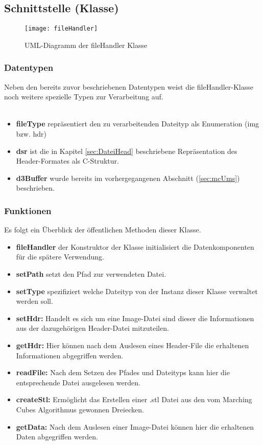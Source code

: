 \subsection{Schnittstelle (Klasse)}
\begin{figure}
	\centering
	\texttt{[image: fileHandler]}
	\caption{UML-Diagramm der fileHandler Klasse}
	\label{fig:fileHandler}
\end{figure}
\subsubsection{Datentypen}
Neben den bereits zuvor beschriebenen Datentypen weist die fileHandler-Klasse noch weitere spezielle Typen zur Verarbeitung auf.\\
\\
\begin{itemize}
	\item \textbf{fileType} repräsentiert den zu verarbeitenden Dateityp als Enumeration (img bzw. hdr) 
	\item \textbf{dsr} ist die in Kapitel \ref{sec:DateiHead} beschriebene Repräsentation des Header-Formates als C-Struktur.
	\item \textbf{d3Buffer} wurde bereits im vorhergegangenen Abschnitt (\ref{sec:mcUms}) beschrieben.
\end{itemize}
\subsubsection{Funktionen}
Es folgt ein Überblick der öffentlichen Methoden dieser Klasse.\\
\begin{itemize}
	\item \textbf{fileHandler} der Konstruktor der Klasse initialisiert die Datenkomponenten für die spätere Verwendung.
	\item \textbf{setPath} setzt den Pfad zur verwendeten Datei.
	\item \textbf{setType} spezifiziert welche Dateityp von der Instanz dieser Klasse verwaltet werden soll.
	\item \textbf{setHdr:} Handelt es sich um eine Image-Datei sind dieser die Informationen aus der dazugehörigen Header-Datei mitzuteilen. 
	\item \textbf{getHdr:} Hier können nach dem Auslesen eines Header-File die erhaltenen Informationen abgegriffen werden. 
	\item \textbf{readFile:} Nach dem Setzen des Pfades und Dateityps kann hier die entsprechende Datei ausgelesen werden.
	\item \textbf{createStl:} Ermöglicht das Erstellen einer .stl Datei aus den vom Marching Cubes Algorithmus gewonnen Dreiecken. 
	\item \textbf{getData:} Nach dem Auslesen einer Image-Datei können hier die erhaltenen Daten abgegriffen werden.
\end{itemize}
